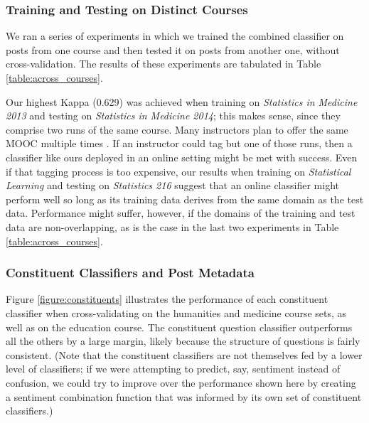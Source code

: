\documentclass{edm_template}
\begin{document}
\subsubsection{Training and Testing on Distinct Courses}
We ran a series of experiments in which we trained the combined classifier on posts from one course and then tested it on posts from another one, without cross-validation. The results of these experiments are tabulated in Table \ref{table:across_courses}. 

Our highest Kappa (0.629) was achieved when training on \emph{Statistics in Medicine 2013} and testing on \emph{Statistics in Medicine 2014}; this makes sense, since they comprise two runs of the same course. Many instructors plan to offer the same MOOC multiple times \cite{hollands2014moocs}. If an instructor could tag but one of those runs, then a classifier like ours deployed in an online setting might be met with success. Even if that tagging process is too expensive, our results when training on \emph{Statistical Learning} and testing on \emph{Statistics 216} suggest that an online classifier might perform well so long as its training data derives from the same domain as the test data. Performance might suffer, however, if the domains of the training and test data are non-overlapping, as is the case in the last two experiments in Table \ref{table:across_courses}.

\subsubsection{Constituent Classifiers and Post Metadata}
Figure \ref{figure:constituents} illustrates the performance of each constituent classifier when cross-validating on the humanities and medicine course sets, as well as on the education course. The constituent question classifier outperforms all the others by a large margin, likely because the structure of questions is fairly consistent. (Note that the constituent classifiers are not themselves fed by a lower level of classifiers; if we were attempting to predict, say, sentiment instead of confusion, we could try to improve over the performance shown here by creating a sentiment combination function that was informed by its own set of constituent classifiers.)
\end{document}
